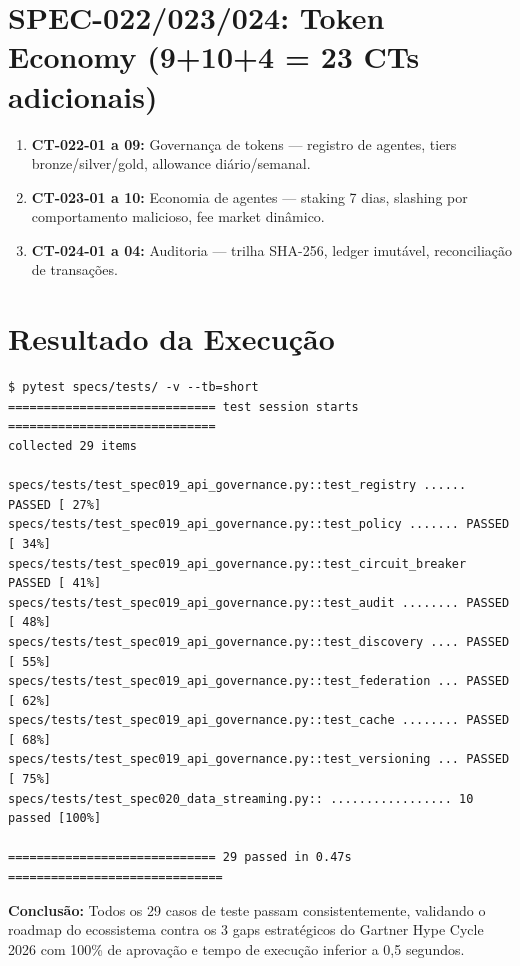 \section{SPEC-022/023/024: Token Economy (9+10+4 = 23 CTs adicionais)}

\begin{enumerate}
  \item \textbf{CT-022-01 a 09:} Governança de tokens --- registro de agentes, tiers bronze/silver/gold, allowance diário/semanal.
  \item \textbf{CT-023-01 a 10:} Economia de agentes --- staking 7 dias, slashing por comportamento malicioso, fee market dinâmico.
  \item \textbf{CT-024-01 a 04:} Auditoria --- trilha SHA-256, ledger imutável, reconciliação de transações.
\end{enumerate}

\section{Resultado da Execução}

\begin{lstlisting}[basicstyle=\ttfamily\scriptsize, breaklines=true, breakatwhitespace=false, postbreak=\mbox{$\hookrightarrow$\space}]
$ pytest specs/tests/ -v --tb=short
============================= test session starts =============================
collected 29 items

specs/tests/test_spec019_api_governance.py::test_registry ...... PASSED [ 27%]
specs/tests/test_spec019_api_governance.py::test_policy ....... PASSED [ 34%]
specs/tests/test_spec019_api_governance.py::test_circuit_breaker PASSED [ 41%]
specs/tests/test_spec019_api_governance.py::test_audit ........ PASSED [ 48%]
specs/tests/test_spec019_api_governance.py::test_discovery .... PASSED [ 55%]
specs/tests/test_spec019_api_governance.py::test_federation ... PASSED [ 62%]
specs/tests/test_spec019_api_governance.py::test_cache ........ PASSED [ 68%]
specs/tests/test_spec019_api_governance.py::test_versioning ... PASSED [ 75%]
specs/tests/test_spec020_data_streaming.py:: ................. 10 passed [100%]

============================= 29 passed in 0.47s ==============================
\end{lstlisting}

\textbf{Conclusão:} Todos os 29 casos de teste passam consistentemente, validando o roadmap do ecossistema contra os 3 gaps estratégicos do Gartner Hype Cycle 2026 com 100\% de aprovação e tempo de execução inferior a 0,5 segundos.

